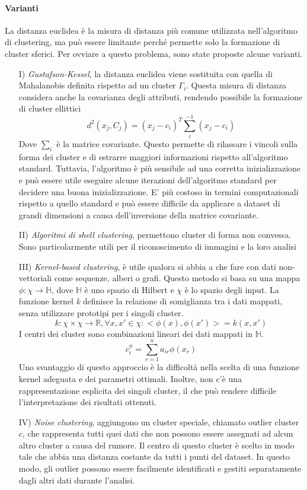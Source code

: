 \paragraph{Varianti}
La distanza euclidea è la misura di distanza più comune utilizzata nell'algoritmo di clustering, ma può essere limitante perché permette solo la formazione di cluster sferici. Per ovviare a questo problema, sono state proposte alcune varianti.

\begin{enumerate}
    \item [I)] \textit{Gustafson-Kessel}, la distanza euclidea viene sostituita con quella di Mahalanobis definita rispetto ad un cluster $\Gamma_i$. Questa misura di distanza considera anche la covarianza degli attributi, rendendo possibile la formazione di cluster ellittici
    $$d^2(x_j,C_j) = (x_j - c_i)^T \sum_i^{-1} (x_j - c_i)$$
    Dove $\sum_i$ è la matrice covariante. Questo permette di rilassare i vincoli sulla forma dei cluster e di estrarre maggiori informazioni rispetto all'algoritmo standard. Tuttavia, l'algoritmo è più sensibile ad una corretta inizializzazione e può essere utile eseguire alcune iterazioni dell'algoritmo standard per decidere una buona inizializzazione. E' più costoso in termini computazionali rispetto a quello standard e può essere difficile da applicare a dataset di grandi dimensioni a causa dell'inversione della matrice covariante.
    \item [II)] \textit{Algoritmi di shell clustering}, permettono cluster di forma non convessa. Sono particolarmente utili per il riconoscimento di immagini e la loro analisi
    \item [III)] \textit{Kernel-based clustering}, è utile qualora si abbia a che fare con dati non-vettoriali come sequenze, alberi o grafi. Questo metodo si basa su una mappa $\phi: \chi \to \mathbb{H}$, dove $\mathbb{H}$ è uno spazio di Hilbert e $\chi$ è lo spazio degli input. La funzione kernel \textit{k} definisce la relazione di somiglianza tra i dati mappati, senza utilizzare prototipi per i singoli cluster. 
    $$k: \chi \times \chi \to \mathbb{R}, \forall x,x' \in \chi: <\phi(x),\phi(x')> = k(x,x')$$
    I centri dei cluster sono combinazioni lineari dei dati mappati in $\mathbb{H}$. 
    $$c_i^{\phi} = \sum_{r=1}^n a_{ir} \phi(x_r)$$
    Uno svantaggio di questo approccio è la difficoltà nella scelta di una funzione kernel adeguata e dei parametri ottimali. Inoltre, non c'è una rappresentazione esplicita dei singoli cluster, il che può rendere difficile l'interpretazione dei risultati ottenuti.
    \item [IV)] \textit{Noise clustering}, aggiungono un cluster speciale, chiamato outlier cluster $c$, che rappresenta tutti quei dati che non possono essere assegnati ad alcun altro cluster a causa del rumore. Il centro di questo cluster è scelto in modo tale che abbia una distanza costante da tutti i punti del dataset. In questo modo, gli outlier possono essere facilmente identificati e gestiti separatamente dagli altri dati durante l'analisi.
\end{enumerate}


